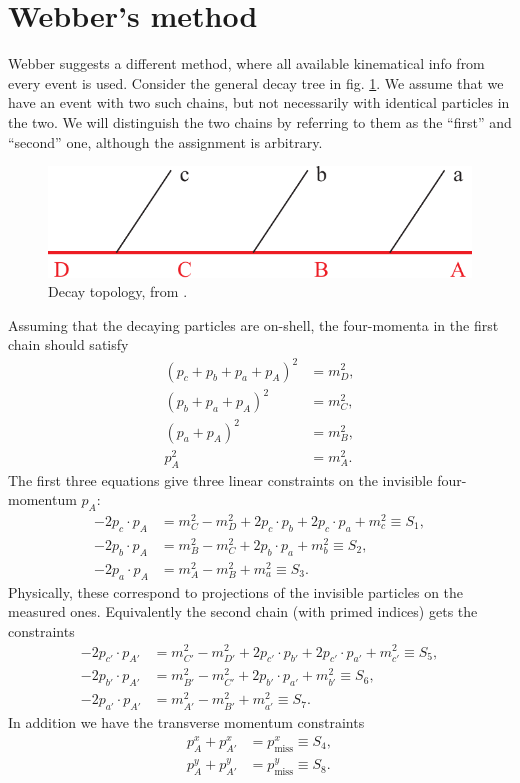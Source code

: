 \documentclass[twoside,english]{uiofysmaster}
\begin{document}
\section{Webber's method}
Webber \cite{Webber:2009vm} suggests a different method, where all available kinematical info from every event is used. Consider the general decay tree in fig. \ref{fig:decaytree}. We assume that we have an event with two such chains, but not necessarily with identical particles in the two. We will distinguish the two chains by referring to them as the ``first'' and ``second'' one, although the assignment is arbitrary.
\begin{figure}[hbt]
\centering
\includegraphics[scale=0.7]{figures/fig-chain.pdf} %
\caption{Decay topology, from \cite{Miller:2005zp}.}
\label{fig:decaytree}
\end{figure}
Assuming that the decaying particles are on-shell, the four-momenta in the first chain should satisfy
\begin{align}
	(p_c + p_b + p_a + p_A)^2 &= m_D^2,\nonumber \\
	(p_b + p_a + p_A)^2 &= m_C^2,\nonumber \\
	(p_a + p_A)^2 &= m_B^2,\label{eq:constraints}\\
	p_A^2 &= m_A^2.\nonumber
\end{align}
The first three equations give three linear constraints on the invisible four-momentum $p_A$:
\begin{align}
	-2p_c\cdot p_A &= m_C^2 - m_D^2 + 2p_c\cdot p_b + 2p_c \cdot p_a + m_c^2 \equiv S_1,\label{eq:constraints_projections1} \\
	-2p_b\cdot p_A &= m_B^2 - m_C^2 + 2p_b\cdot p_a + m_b^2 \equiv S_2,\\
	-2p_a\cdot p_A &= m_A^2 - m_B^2 + m_a^2 \equiv S_3.
\end{align}
Physically, these correspond to projections of the invisible particles on the measured ones. Equivalently the second chain (with primed indices) gets the constraints
\begin{align}
	-2p_{c'}\cdot p_{A'} &= m_{C'}^2 - m_{D'}^2 + 2p_{c'}\cdot p_{b'} + 2p_{c'} \cdot p_{a'} + m_{c'}^2 \equiv S_5, \\ 
	-2p_{b'}\cdot p_{A'} &= m_{B'}^2 - m_{C'}^2 + 2p_{b'}\cdot p_{a'} + m_{b'}^2 \equiv S_6,\\
	-2p_{a'}\cdot p_{A'} &= m_{A'}^2 - m_{B'}^2 + m_{a'}^2 \equiv S_7.\label{eq:constraints_projections6}
\end{align}
In addition we have the transverse momentum constraints
\begin{align}
	p_A^x + p_{A'}^x &= p_\mathrm{miss}^x \equiv S_4, \label{eq:Svec_orig} \\
	p_A^y + p_{A'}^y &= p_\mathrm{miss}^y \equiv S_8. \nonumber
\end{align}
\end{document}
